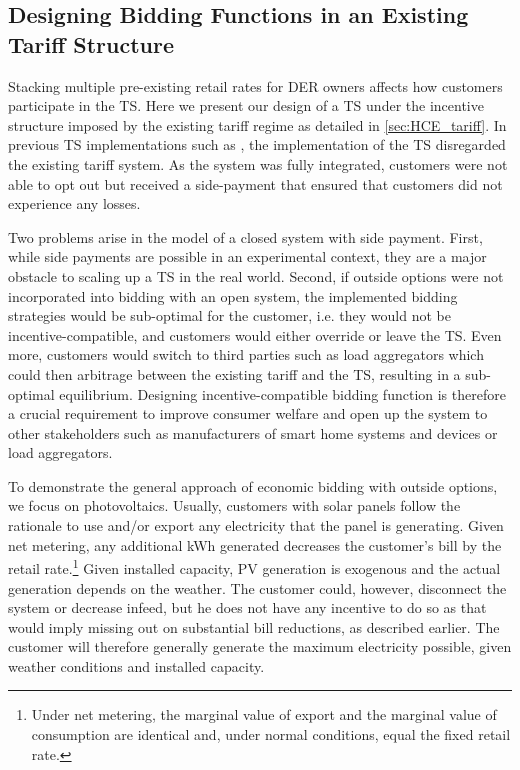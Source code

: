 \subsection{Designing Bidding Functions in an Existing Tariff Structure}\label{sec:HCE_design}

Stacking multiple pre-existing retail rates for DER owners affects how customers participate in the TS. Here we present our design of a TS under the incentive structure imposed by the existing tariff regime as detailed in \cref{sec:HCE_tariff}. 
In previous TS implementations such as \citet{hammerstrom_2008}, the implementation of the TS disregarded the existing tariff system. As the system was fully integrated, customers were not able to opt out but received a side-payment that ensured that customers did not experience any losses.

Two problems arise in the model of a closed system with side payment. 
First, while side payments are possible in an experimental context, they are a major obstacle to scaling up a TS in the real world. 
Second, if outside options were not incorporated into bidding with an open system, the implemented bidding strategies would be sub-optimal for the customer, i.e. they would not be incentive-compatible, and customers would either override or leave the TS. Even more, customers would switch to third parties such as load aggregators which could then arbitrage between the existing tariff and the TS, resulting in a sub-optimal equilibrium.
Designing incentive-compatible bidding function is therefore a crucial requirement to improve consumer welfare and open up the system to other stakeholders such as manufacturers of smart home systems and devices or load aggregators.

To demonstrate the general approach of economic bidding with outside options, we focus on photovoltaics.
Usually, customers with solar panels follow the rationale to use and/or export any electricity that the panel is generating.
Given net metering, any additional kWh generated decreases the customer's bill by the retail rate.\footnote{Under net metering, the marginal value of export and the marginal value of consumption are identical and, under normal conditions, equal the fixed retail rate.}
Given installed capacity, PV generation is exogenous and the actual generation depends on the weather. The customer could, however, disconnect the system or decrease infeed, but he does not have any incentive to do so as that would imply missing out on substantial bill reductions, as described earlier. 
The customer will therefore generally generate the maximum electricity possible, given weather conditions and installed capacity.

